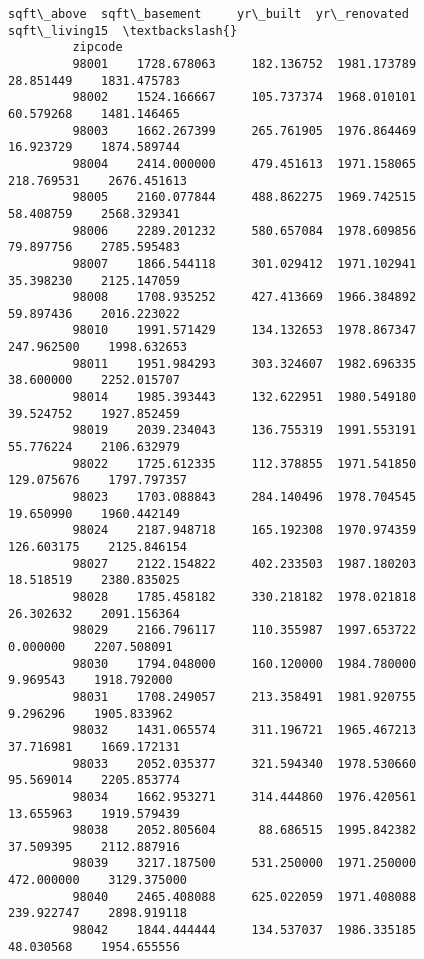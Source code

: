 \documentclass[11pt]{article}
\begin{document}
\begin{Verbatim}[commandchars=\\\{\}]
                   sqft\_above  sqft\_basement     yr\_built  yr\_renovated  sqft\_living15  \textbackslash{}
         zipcode                                                                         
         98001    1728.678063     182.136752  1981.173789     28.851449    1831.475783   
         98002    1524.166667     105.737374  1968.010101     60.579268    1481.146465   
         98003    1662.267399     265.761905  1976.864469     16.923729    1874.589744   
         98004    2414.000000     479.451613  1971.158065    218.769531    2676.451613   
         98005    2160.077844     488.862275  1969.742515     58.408759    2568.329341   
         98006    2289.201232     580.657084  1978.609856     79.897756    2785.595483   
         98007    1866.544118     301.029412  1971.102941     35.398230    2125.147059   
         98008    1708.935252     427.413669  1966.384892     59.897436    2016.223022   
         98010    1991.571429     134.132653  1978.867347    247.962500    1998.632653   
         98011    1951.984293     303.324607  1982.696335     38.600000    2252.015707   
         98014    1985.393443     132.622951  1980.549180     39.524752    1927.852459   
         98019    2039.234043     136.755319  1991.553191     55.776224    2106.632979   
         98022    1725.612335     112.378855  1971.541850    129.075676    1797.797357   
         98023    1703.088843     284.140496  1978.704545     19.650990    1960.442149   
         98024    2187.948718     165.192308  1970.974359    126.603175    2125.846154   
         98027    2122.154822     402.233503  1987.180203     18.518519    2380.835025   
         98028    1785.458182     330.218182  1978.021818     26.302632    2091.156364   
         98029    2166.796117     110.355987  1997.653722      0.000000    2207.508091   
         98030    1794.048000     160.120000  1984.780000      9.969543    1918.792000   
         98031    1708.249057     213.358491  1981.920755      9.296296    1905.833962   
         98032    1431.065574     311.196721  1965.467213     37.716981    1669.172131   
         98033    2052.035377     321.594340  1978.530660     95.569014    2205.853774   
         98034    1662.953271     314.444860  1976.420561     13.655963    1919.579439   
         98038    2052.805604      88.686515  1995.842382     37.509395    2112.887916   
         98039    3217.187500     531.250000  1971.250000    472.000000    3129.375000   
         98040    2465.408088     625.022059  1971.408088    239.922747    2898.919118   
         98042    1844.444444     134.537037  1986.335185     48.030568    1954.655556   

\end{Verbatim}
\end{document}
